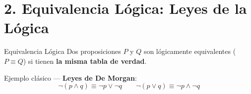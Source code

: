 \documentclass[aspectratio=169,10pt]{beamer}
\begin{document}
\section{2. Equivalencia Lógica: Leyes de la Lógica}

\begin{frame}{Equivalencia Lógica}
Dos proposiciones $P$ y $Q$ son \alert{lógicamente equivalentes} ($P \equiv Q$) si tienen \textbf{la misma tabla de verdad}.

\vspace{1em}
Ejemplo clásico — \textbf{Leyes de De Morgan}:
\[
\neg(p \land q) \equiv \neg p \lor \neg q
\qquad
\neg(p \lor q) \equiv \neg p \land \neg q
\]
\end{frame}
\end{document}
